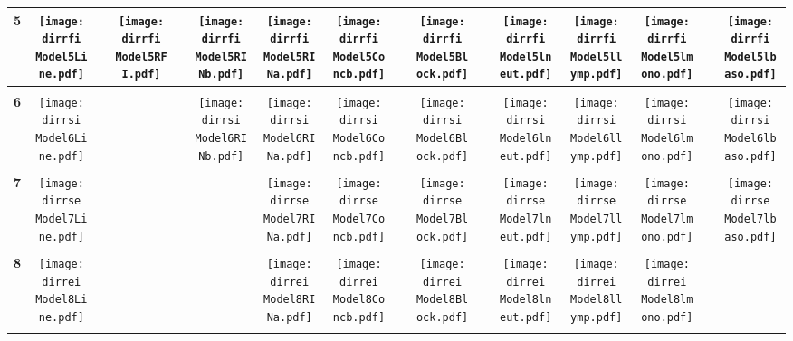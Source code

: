 \documentclass[landscape,a1paper, onecolumn]{paper}
\def \dirrfi {/run/user/1000/gvfs/smb-share:server=cyfiles.iastate.edu,share=09/22/ntyet/R/RA/Data/RFI-newdata/result4/Model5.Line.RFI.Concb.RINb.RINa.lneut.llymp.lmono.lbaso.Block/}
\def \dirrsi{/run/user/1000/gvfs/smb-share:server=cyfiles.iastate.edu,share=09/22/ntyet/R/RA/Data/RFI-newdata/result4/Model6.Line.Concb.RINb.RINa.lneut.llymp.lmono.lbaso.Block/}
\def \dirrse{/run/user/1000/gvfs/smb-share:server=cyfiles.iastate.edu,share=09/22/ntyet/R/RA/Data/RFI-newdata/result4/Model7.Line.Concb.RINa.lneut.llymp.lmono.lbaso.Block/}
\def \dirrei{/run/user/1000/gvfs/smb-share:server=cyfiles.iastate.edu,share=09/22/ntyet/R/RA/Data/RFI-newdata/result4/Model8.Line.Concb.RINa.lneut.llymp.lmono.Block/}
\begin{document}
\begin{table}
\begin{tabular}{cccccccccccccccc}
     {\Huge \textbf{5}} 
      &\texttt{[image: \\dirrfi Model5Line.pdf]}
      &
      &\texttt{[image: \\dirrfi Model5RFI.pdf]}
      &
      &\texttt{[image: \\dirrfi Model5RINb.pdf]}
      &\texttt{[image: \\dirrfi Model5RINa.pdf]}
      &\texttt{[image: \\dirrfi Model5Concb.pdf]}
      &
      &\texttt{[image: \\dirrfi Model5Block.pdf]}
      &
      &\texttt{[image: \\dirrfi Model5lneut.pdf]}
      &\texttt{[image: \\dirrfi Model5llymp.pdf]}
      &\texttt{[image: \\dirrfi Model5lmono.pdf]}
      &
      &\texttt{[image: \\dirrfi Model5lbaso.pdf]}
     \\[5pt]
     \hline
     \\[5pt]
     
     {\Huge \textbf{6}} 
      &\texttt{[image: \\dirrsi Model6Line.pdf]}
      &
      &
      &
      &\texttt{[image: \\dirrsi Model6RINb.pdf]}
      &\texttt{[image: \\dirrsi Model6RINa.pdf]}
      &\texttt{[image: \\dirrsi Model6Concb.pdf]}
      &
      &\texttt{[image: \\dirrsi Model6Block.pdf]}
      &
      &\texttt{[image: \\dirrsi Model6lneut.pdf]}
      &\texttt{[image: \\dirrsi Model6llymp.pdf]}
      &\texttt{[image: \\dirrsi Model6lmono.pdf]}
      &
      &\texttt{[image: \\dirrsi Model6lbaso.pdf]}
     \\[5pt]
     \hline
     \\[5pt]
     {\Huge \textbf{7}} 
      &\texttt{[image: \\dirrse Model7Line.pdf]}
      &
      &
      &
      &
      &\texttt{[image: \\dirrse Model7RINa.pdf]}
      &\texttt{[image: \\dirrse Model7Concb.pdf]}
      &
      &\texttt{[image: \\dirrse Model7Block.pdf]}
      &
      &\texttt{[image: \\dirrse Model7lneut.pdf]}
      &\texttt{[image: \\dirrse Model7llymp.pdf]}
      &\texttt{[image: \\dirrse Model7lmono.pdf]}
      &
      &\texttt{[image: \\dirrse Model7lbaso.pdf]}
     \\[5pt]
     \hline
     \\[5pt]
     {\Huge \textbf{8}} 
      &\texttt{[image: \\dirrei Model8Line.pdf]}
      &
      &
      &
      &
      &\texttt{[image: \\dirrei Model8RINa.pdf]}
      &\texttt{[image: \\dirrei Model8Concb.pdf]}
      &
      &\texttt{[image: \\dirrei Model8Block.pdf]}
      &
      &\texttt{[image: \\dirrei Model8lneut.pdf]}
      &\texttt{[image: \\dirrei Model8llymp.pdf]}
      &\texttt{[image: \\dirrei Model8lmono.pdf]}
      &
      &
     \\[5pt]
     \hline
     \\[5pt]
\end{tabular}
\end{table}
\end{document}
